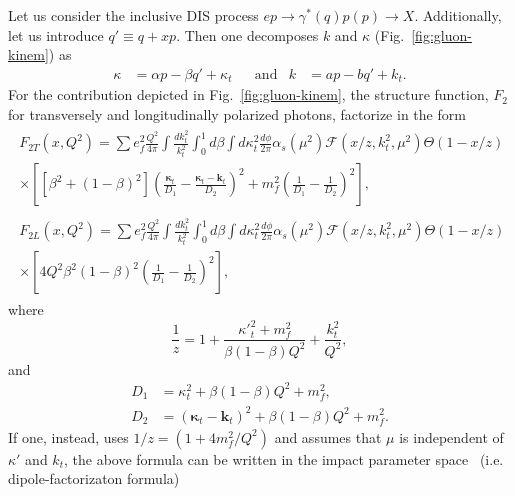 \documentclass[11pt]{article}
\numberwithin{equation}{section}
\numberwithin{table}{section}
\numberwithin{figure}{section}
\begin{document}
Let us consider the inclusive DIS process $e p\rightarrow \gamma^* (q) p(p)\rightarrow X$. %
Additionally, let us introduce $q'\equiv q+x p$. 
Then one  decomposes $k$ and $\kappa$ (Fig.~\ref{fig:gluon-kinem}) as
\begin{align}
    \kappa&=\alpha p-\beta q'+\kappa_t&&\mathrm{and}& k&=a p- bq'+k_t.
\end{align}
For the contribution depicted in Fig.~\ref{fig:gluon-kinem}, the structure function, $F_2$ for transversely and longitudinally polarized photons, factorize in the form~\cite{Kimber:2001uaa} 
\begin{align}
	\begin{split}
		F_{2T}(x,Q^2)=\sum e^2_f\frac{Q^2}{4\pi}\int\frac{d k_t^2}{k_t^2}\int^1_0 d\beta\int d \kappa_t ^2 \frac{d\phi}{2\pi}\alpha_s(\mu^2)\mathcal{F}(x/z,k^2_t,\mu^2)\Theta(1-x/z)&\\
		\times\left[
		\left[\beta^2+(1-\beta)^2\right]
		\left(\frac{\boldsymbol{\kappa}_t}{D_1}-\frac{\boldsymbol{\kappa}_t-\mathbf{k}_t}{D_2}\right)^2
		+m_f^2\left(\frac{1}{D_1}-\frac{1}{D_2}\right)^2
		\right],&
		\label{eq:angle-unintegratedT}
	\end{split}\\
	\begin{split}
		F_{2L}(x,Q^2)=\sum e^2_f\frac{Q^2}{4\pi}\int\frac{d k_t^2}{k_t^2}\int^1_0 d\beta\int d \kappa_t ^2 \frac{d\phi}{2\pi}\alpha_s(\mu^2)\mathcal{F}(x/z,k^2_t,\mu^2)\Theta(1-x/z)&\\
		\times\left[
		4Q^2\beta^2 (1-\beta)^2\left(\frac{1}{D_1}-\frac{1}{D_2}\right)^2
		\right],&
		\label{eq:angle-unintegratedL}
	\end{split}
\end{align}
where
\begin{equation}
	\frac{1}{z}=1+\frac{{\kappa'}^2_t+m_f^2}{\beta(1-\beta)Q^2}+\frac{k^2_t}{Q^2},
	\label{eq:z}
\end{equation}
and
\begin{equation}
	\begin{split}
		D_1&=\kappa_t^2+\beta(1-\beta)Q^2+m_f^2,\\
		D_2&=(\boldsymbol{\kappa}_t-\mathbf{k}_t)^2+\beta(1-\beta)Q^2+m_f^2.
	\end{split}
\end{equation}
If one, instead, uses $ 1/z=\left(1+4 m_f^2/Q^2\right)$ and assumes that $\mu$ is independent of $\kappa'$ and $k_t$, 
the above formula can be written in the impact parameter space~\cite{Golec-Biernat:1998zce} (i.e. dipole-factorizaton formula)
\end{document}
